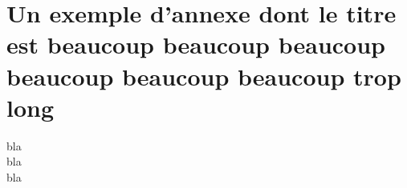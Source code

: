 \chapter[Un titre court pour annexes]{Un exemple d'annexe dont le titre est beaucoup beaucoup beaucoup beaucoup beaucoup beaucoup trop long}
\noindent
bla\\
bla\\
bla